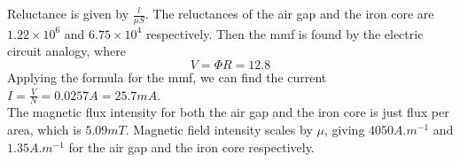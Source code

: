 \documentclass[answers]{exam}
\begin{document}
\begin{questions}

\begin{solution}
    Reluctance is given by $\frac{l}{\mu S}$. The reluctances of the air gap and the iron core are $1.22\times10^6$ and $6.75\times10^4$ respectively. Then the mmf is found by the electric circuit analogy, where
    $$V = \Phi R = 12.8$$
    Applying the formula for the mmf, we can find the current $I = \frac{V}{N} = 0.0257\unit{A} = 25.7\unit{mA}$. \\
    The magnetic flux intensity for both the air gap and the iron core is just flux per area, which is $5.09\unit{mT}$. Magnetic field intensity scales by $\mu$, giving $4050\unit{A.m^{-1}}$ and $1.35\unit{A.m^{-1}}$ for the air gap and the iron core respectively.
\end{solution}

\end{questions}
\end{document}

